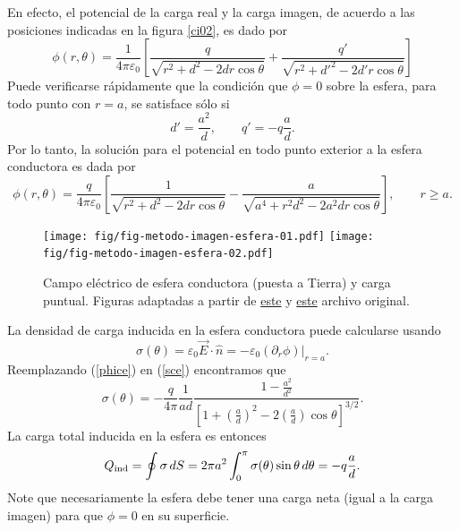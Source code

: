 En efecto, el potencial de la carga real y la carga imagen, de acuerdo a las posiciones indicadas en la figura \ref{ci02}, es dado por
\begin{equation}
 \phi(r,\theta)=\frac{1}{4\pi\varepsilon_0}\left[\frac{q}{\sqrt{
r^2+d^2-2dr\cos\theta } } +\frac{q'}{\sqrt{r^2+d'^2-2d'r\cos\theta}}\right]
\end{equation}
Puede verificarse rápidamente que la condición que $\phi=0$ sobre la esfera, para todo punto con $r=a$, se satisface sólo si
\begin{equation}
 d'=\frac{a^2}{d}, \qquad q'=-q\frac{a}{d}.
\end{equation}
Por lo tanto, la solución para el potencial en todo punto exterior a la
esfera conductora es dada por
\begin{equation}\label{phice}
 \phi(r,\theta)=\frac{q}{4\pi\varepsilon_0}\left[\frac{1}{\sqrt{
r^2+d^2-2dr\cos\theta}}
-\frac{a}{\sqrt{a^4+r^2d^2-2a^2dr\cos\theta}}\right], \qquad r\ge a .
\end{equation}
\begin{center}
\begin{figure}[H]
\centerline{\texttt{[image: fig/fig-metodo-imagen-esfera-01.pdf]}
\hspace{2cm}\texttt{[image: fig/fig-metodo-imagen-esfera-02.pdf]}}
\caption{Campo eléctrico de esfera conductora (puesta a Tierra) y carga puntual. 
Figuras adaptadas a partir de  \href{http://commons.wikimedia.org/wiki/File:VFPt_metal_ball_grounded.svg}{este} y \href{http://commons.wikimedia.org/wiki/File:VFPt_metal_ball_grounded_transparent.svg}{este} archivo original.}
\label{fig:eyc}
\end{figure}
\end{center}
La densidad de carga inducida en la esfera conductora puede calcularse usando
\begin{equation}\label{sce}
 \sigma(\theta)=\varepsilon_0\vec{E}\cdot\hat{n}
=-\varepsilon_0\left.(\partial_r\phi)\right|_{r=a}.
\end{equation}
Reemplazando (\ref{phice}) en (\ref{sce}) encontramos que
\begin{equation}
 \sigma(\theta)=-\frac{q}{4\pi}\frac{1}{ad}\frac{1-\frac{a^2}{d^2
}}{\left[1+\left(\frac{a}{d}\right)^2-2\left(\frac{a}{d}\right)\cos\theta\right]
^{3/2}}.
\end{equation}
La carga total inducida en la esfera es entonces
\begin{equation}
 Q_{\rm ind}=\oint\sigma\,dS=2\pi
a^2\int_0^\pi\sigma(\theta)\sin\theta\,d\theta=-q\frac{a}{d}.
\end{equation}
Note que necesariamente la esfera debe tener una carga neta (igual a la carga imagen) para que $\phi=0$ en su superficie.

